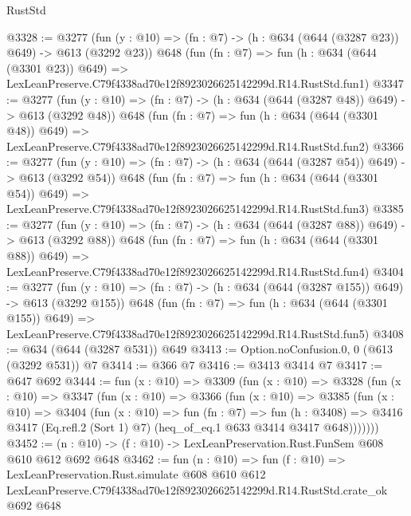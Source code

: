 \begin{lexlean}{RustStd}
\begin{coremodule}
@3328 := @3277
    (fun (y : @10) => (fn : @7) -> (h : @634 (@644 (@3287 @23)) @649) -> @613 (@3292 @23))
    @648
    (fun (fn : @7) =>
    fun (h : @634 (@644 (@3301 @23)) @649) =>
    LexLeanPreserve.C79f4338ad70e12f8923026625142299d.R14.RustStd.fun1)
@3347 := @3277
    (fun (y : @10) => (fn : @7) -> (h : @634 (@644 (@3287 @48)) @649) -> @613 (@3292 @48))
    @648
    (fun (fn : @7) =>
    fun (h : @634 (@644 (@3301 @48)) @649) =>
    LexLeanPreserve.C79f4338ad70e12f8923026625142299d.R14.RustStd.fun2)
@3366 := @3277
    (fun (y : @10) => (fn : @7) -> (h : @634 (@644 (@3287 @54)) @649) -> @613 (@3292 @54))
    @648
    (fun (fn : @7) =>
    fun (h : @634 (@644 (@3301 @54)) @649) =>
    LexLeanPreserve.C79f4338ad70e12f8923026625142299d.R14.RustStd.fun3)
@3385 := @3277
    (fun (y : @10) => (fn : @7) -> (h : @634 (@644 (@3287 @88)) @649) -> @613 (@3292 @88))
    @648
    (fun (fn : @7) =>
    fun (h : @634 (@644 (@3301 @88)) @649) =>
    LexLeanPreserve.C79f4338ad70e12f8923026625142299d.R14.RustStd.fun4)
@3404 := @3277
    (fun (y : @10) => (fn : @7) -> (h : @634 (@644 (@3287 @155)) @649) -> @613 (@3292 @155))
    @648
    (fun (fn : @7) =>
    fun (h : @634 (@644 (@3301 @155)) @649) =>
    LexLeanPreserve.C79f4338ad70e12f8923026625142299d.R14.RustStd.fun5)
@3408 := @634 (@644 (@3287 @531)) @649
@3413 := Option.noConfusion.{0, 0} (@613 (@3292 @531)) @7
@3414 := @366 @7
@3416 := @3413 @3414 @7
@3417 := @647 @692
@3444 := fun (x : @10) =>
  @3309
    (fun (x : @10) =>
    @3328
      (fun (x : @10) =>
      @3347
        (fun (x : @10) =>
        @3366
          (fun (x : @10) =>
          @3385
            (fun (x : @10) =>
            @3404
              (fun (x : @10) =>
              fun (fn : @7) =>
              fun (h : @3408) =>
              @3416 @3417 (Eq.refl.{2} (Sort 1) @7) (heq_of_eq.{1} @633 @3414 @3417 @648)))))))
@3452 := (n : @10) -> (f : @10) -> LexLeanPreservation.Rust.FunSem @608 @610 @612 @692 @648
@3462 := fun (n : @10) =>
  fun (f : @10) =>
  LexLeanPreservation.Rust.simulate
    @608
    @610
    @612
    LexLeanPreserve.C79f4338ad70e12f8923026625142299d.R14.RustStd.crate_ok
    @692
    @648
\end{coremodule}
\end{lexlean}
